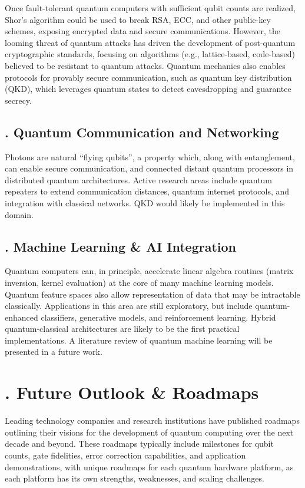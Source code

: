 \documentclass{elbioimp2}
\begin{document}
Once fault-tolerant quantum computers with sufficient qubit counts are realized, Shor’s algorithm could be used to break RSA, ECC, and other public-key schemes, exposing encrypted data and secure communications.
However, the looming threat of quantum attacks has driven the development of post-quantum cryptographic standards, focusing on algorithms (e.g., lattice-based, code-based) believed to be resistant to quantum attacks. Quantum mechanics also enables protocols for provably secure communication, such as quantum key distribution (QKD), which leverages quantum states to detect eavesdropping and guarantee secrecy.

\subsection{. Quantum Communication and Networking}
Photons are natural “flying qubits”, a property which, along with entanglement, can enable secure communication, and connected distant quantum processors in distributed quantum architectures. Active research areas include quantum repeaters to extend communication distances, quantum internet protocols, and integration with classical networks. QKD would likely be implemented in this domain.

\subsection{. Machine Learning \& AI Integration}
Quantum computers can, in principle, accelerate linear algebra routines (matrix inversion, kernel evaluation) at the core of many machine learning models. Quantum feature spaces also allow representation of data that may be intractable classically. Applications in this area are still exploratory, but include quantum-enhanced classifiers, generative models, and reinforcement learning. Hybrid quantum-classical architectures are likely to be the first practical implementations. A literature review of quantum machine learning will be presented in a future work.

\section{. Future Outlook \& Roadmaps}
Leading technology companies and research institutions have published roadmaps outlining their visions for the development of quantum computing over the next decade and beyond. These roadmaps typically include milestones for qubit counts, gate fidelities, error correction capabilities, and application demonstrations, with unique roadmaps for each quantum hardware platform, as each platform has its own strengths, weaknesses, and scaling challenges.
\end{document}
